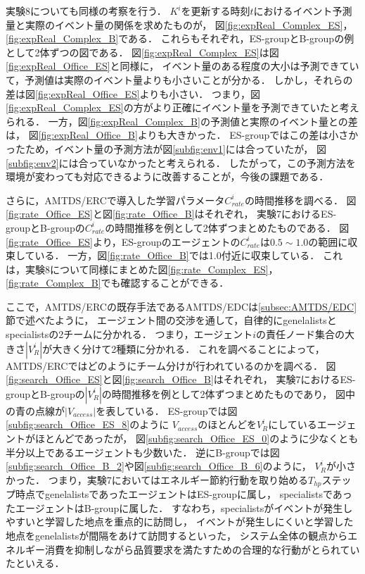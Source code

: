 \documentclass[12pt,a4j,twoside]{jarticle}
\begin{document}
  実験8についても同様の考察を行う．
  $K^i$を更新する時刻$t$におけるイベント予測量と実際のイベント量の関係を求めたものが，
  図\ref{fig:expReal_Complex_ES}，\ref{fig:expReal_Complex_B}である．
  これらもそれぞれ，ES-groupとB-groupの例として2体ずつの図である．
  図\ref{fig:expReal_Complex_ES}は図\ref{fig:expReal_Office_ES}と同様に，
  イベント量のある程度の大小は予測できていて，予測値は実際のイベント量よりも小さいことが分かる．
  しかし，それらの差は図\ref{fig:expReal_Office_ES}よりも小さい．
  つまり，図\ref{fig:expReal_Complex_ES}の方がより正確にイベント量を予測できていたと考えられる．
  一方，図\ref{fig:expReal_Complex_B}の予測値と実際のイベント量との差は，
  図\ref{fig:expReal_Office_B}よりも大きかった．
  ES-groupではこの差は小さかったため，イベント量の予測方法が図\ref{subfig:env1}には合っていたが，
  図\ref{subfig:env2}には合っていなかったと考えられる．
  したがって，この予測方法を環境が変わっても対応できるように改善することが，今後の課題である．
  \par

  さらに，AMTDS/ERCで導入した学習パラメータ$C^i_{rate}$の時間推移を調べる．
  図\ref{fig:rate_Office_ES}と図\ref{fig:rate_Office_B}はそれぞれ，
  実験7におけるES-groupとB-groupの$C^i_{rate}$の時間推移を例として2体ずつまとめたものである．
  図\ref{fig:rate_Office_ES}より，ES-groupのエージェントの$C^i_{rate}$は$0.5\sim1.0$の範囲に収束している．
  一方，図\ref{fig:rate_Office_B}では1.0付近に収束している．
  これは，実験8について同様にまとめた図\ref{fig:rate_Complex_ES}，\ref{fig:rate_Complex_B}でも確認することができる．
  \par

  ここで，AMTDS/ERCの既存手法であるAMTDS/EDCは\ref{subsec:AMTDS/EDC}節で述べたように，
  エージェント間の交渉を通して，自律的にgenelalistsとspecialistsの2チームに分かれる．
  つまり，エージェント$i$の責任ノード集合の大きさ$|V^i_R|$が大きく分けて2種類に分かれる．
  これを調べることによって，AMTDS/ERCではどのようにチーム分けが行われているのかを調べる．
  図\ref{fig:search_Office_ES}と図\ref{fig:search_Office_B}はそれぞれ，
  実験7におけるES-groupとB-groupの$|V^i_R|$の時間推移を例として2体ずつまとめたものであり，
  図中の青の点線が$|V_{access}|$を表している．
  ES-groupでは図\ref{subfig:search_Office_ES_8}のように
  $V_{access}$のほとんどを$V^i_R$にしているエージェントがほとんどであったが，
  図\ref{subfig:search_Office_ES_0}のように少なくとも半分以上であるエージェントも少数いた．
  逆にB-groupでは図\ref{subfig:search_Office_B_2}や図\ref{subfig:search_Office_B_6}のように，
  $V^i_R$が小さかった．
  つまり，実験7においてはエネルギー節約行動を取り始める$T_{hp}$ステップ時点でgenelalistsであったエージェントはES-groupに属し，
  specialistsであったエージェントはB-groupに属した．
  すなわち，specialistsがイベントが発生しやすいと学習した地点を重点的に訪問し，
  イベントが発生しにくいと学習した地点をgenelalistsが間隔をあけて訪問するといった，
  システム全体の観点からエネルギー消費を抑制しながら品質要求を満たすための合理的な行動がとられていたといえる．
  \par
\end{document}
